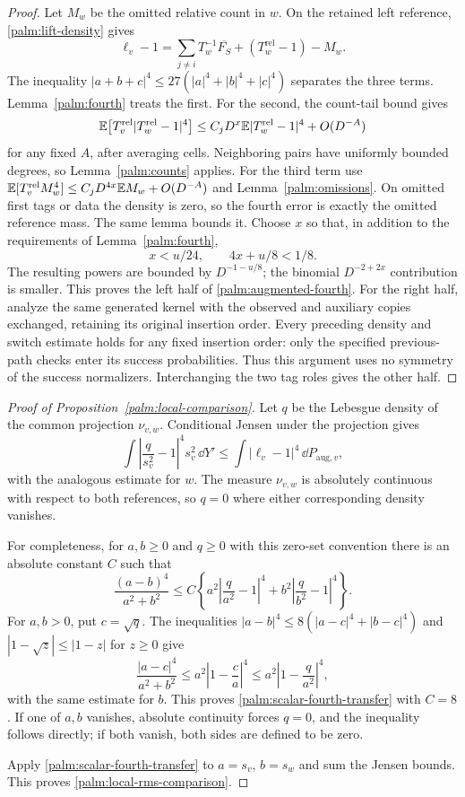 \begin{proof}
Let $M_w$ be the omitted relative count in $w$.  On the retained left
reference, \eqref{palm:lift-density} gives
\[
 \ell_v-1=\sum_{j\ne i}T_w^{-1}\overline{F_S}
                  +(T_w^{\mathrm{rel}}-1)-M_w.
\]
The inequality $|a+b+c|^4\le27(|a|^4+|b|^4+|c|^4)$ separates the
three terms.  Lemma~\ref{palm:fourth} treats the first.  For the second,
the count-tail bound gives
\[
 \mathbb E\bigl[T_v^{\mathrm{rel}}|T_w^{\mathrm{rel}}-1|^4\bigr]
 \le C_jD^x\mathbb E|T_w^{\mathrm{rel}}-1|^4+O(D^{-A})
\]
for any fixed $A$, after averaging cells.  Neighboring pairs have
uniformly bounded degrees, so Lemma~\ref{palm:counts} applies.
For the third term use
$\mathbb E[T_v^{\mathrm{rel}}M_w^4]
 \le C_jD^{4x}\mathbb E M_w+O(D^{-A})$
and Lemma~\ref{palm:omissions}.
On omitted first tags or data the density is zero, so the fourth
error is exactly the omitted reference mass.  The same lemma bounds
it.  Choose $x$ so that, in addition to the requirements of
Lemma~\ref{palm:fourth},
\[
       x<u/24,\qquad 4x+u/8<1/8.
\]
The resulting powers are bounded by $D^{-1-u/8}$; the binomial
$D^{-2+2x}$ contribution is smaller.  This proves the left half of
\eqref{palm:augmented-fourth}.  For the right half, analyze the same
generated kernel with the observed and auxiliary copies exchanged,
retaining its original insertion order.  Every preceding density and
switch estimate holds for any fixed insertion order: only the specified
previous-path checks enter its success probabilities.  Thus this argument
uses no symmetry of the success normalizers.  Interchanging the two tag
roles gives the other half.
\end{proof}

\begin{proof}[Proof of Proposition~\ref{palm:local-comparison}]
Let $q$ be the Lebesgue density of the common projection $\nu_{v,w}$.
Conditional Jensen under the projection gives
\[
 \int\left|\frac q{s_v^2}-1\right|^4s_v^2\,\dd Y'
       \le\int|\ell_v-1|^4\,\dd P_{\mathrm{aug},v},
\]
with the analogous estimate for $w$.  The measure $\nu_{v,w}$ is
absolutely continuous with respect to both references, so $q=0$
where either corresponding density vanishes.

For completeness, for $a,b\ge0$ and $q\ge0$ with this zero-set
convention there is an absolute constant $C$ such that
\begin{equation}\label{palm:scalar-fourth-transfer}
 \frac{(a-b)^4}{a^2+b^2}
 \le C\left\{a^2\left|\frac q{a^2}-1\right|^4
            +b^2\left|\frac q{b^2}-1\right|^4\right\}.
\end{equation}
For $a,b>0$, put $c=\sqrt q$.  The inequalities
$|a-b|^4\le8(|a-c|^4+|b-c|^4)$ and
$|1-\sqrt z|\le|1-z|$ for $z\ge0$ give
\[
 \frac{|a-c|^4}{a^2+b^2}
 \le a^2\left|1-\frac c a\right|^4
 \le a^2\left|1-\frac q{a^2}\right|^4,
\]
with the same estimate for $b$.  This proves
\eqref{palm:scalar-fourth-transfer} with $C=8$.  If one of $a,b$
vanishes, absolute continuity forces $q=0$, and the inequality follows
directly; if both vanish, both sides are defined to be zero.

Apply \eqref{palm:scalar-fourth-transfer} to $a=s_v$, $b=s_w$ and sum
the Jensen bounds.  This proves \eqref{palm:local-rms-comparison}.
\end{proof}
